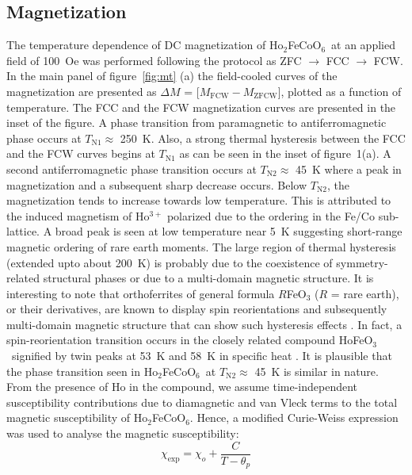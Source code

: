 \documentclass[12pt,twocolumns]{iopart}
\newcommand{\HFCO}{Ho$_2$FeCoO$_6$}
\newcommand{\HFO}{HoFeO$_{3}$}
\begin{document}
\subsection{\label{mag} Magnetization}
The temperature dependence of DC magnetization of \HFCO\ at an applied field of
100~Oe was performed following the protocol as ZFC $\rightarrow$ FCC $\rightarrow$ FCW.
In the main panel of figure~\ref{fig:mt} (a) the
field-cooled curves of the magnetization are presented as
$\Delta M$ = [$M_\mathrm{FCW} - M_\mathrm{ZFCW}$], plotted as a function
of temperature.
The FCC and the FCW magnetization curves are presented in the inset of the figure.
A phase transition from paramagnetic to antiferromagnetic phase occurs at
$T_\mathrm{N1} \approx$ 250~K.
Also, a strong thermal hysteresis between the
FCC and the FCW curves begins at $T_\mathrm{N1}$ as can be seen in the inset
of figure~1(a).
A second antiferromagnetic phase transition occurs at $T_\mathrm{N2} \approx$ 45~K where
a peak in magnetization and a subsequent sharp decrease occurs.
Below $T_\mathrm{N2}$, the magnetization tends to increase towards low temperature.
This is attributed to the induced magnetism of Ho$^{3+}$ polarized due to
the ordering in the Fe/Co sub-lattice. A broad peak is seen at
low temperature near 5~K suggesting short-range magnetic
ordering of rare earth moments.
The large region of thermal hysteresis (extended upto about 200~K) is probably
due to the coexistence of symmetry-related
structural phases or due to a multi-domain magnetic structure.
It is interesting to note that orthoferrites of general formula $R$FeO$_3$
($R$ = rare earth), or their derivatives, are known to display spin reorientations and subsequently
multi-domain magnetic structure that can show such hysteresis effects \cite{white1969review,nair_TFMO}.
In fact, a spin-reorientation transition occurs
in the closely related compound \HFO\ signified by twin peaks
at 53~K and 58~K in specific heat \cite{bhattacharjee2002heat,saito2001high}.
It is plausible that the phase transition seen in
\HFCO\ at $T_\mathrm{N2}\approx$ 45~K is similar in nature.
\\
From the presence of Ho in the compound,
we assume time-independent susceptibility contributions
due to diamagnetic and van Vleck terms to the
total magnetic susceptibility of \HFCO.
Hence, a modified Curie-Weiss expression was used
to analyse the magnetic susceptibility:
\begin{equation}
\chi_\mathrm{exp} = \chi_{{o}} + \frac{C}{T - \theta_p}
\label{eqn:1}
\end{equation}
\end{document}
